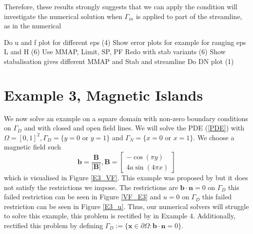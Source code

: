 \documentclass[12pt]{ociamthesis}
\begin{document}
Therefore, these results strongly suggests that we can apply the condition  will investigate the numerical solution when $\Gamma_{in}$ is applied to part of the streamline, as in the numerical

Do u and f plot for different eps (4)
Show error plots for example for ranging eps  L and H (6)
Use MMAP, Limit, SP, PF
Redo with stab variants (6)
Show stabalisation gives different MMAP and Stab and streamline
Do DN plot (1)

\section{Example 3, Magnetic Islands}
We now solve an example on a square domain with non-zero boundary conditions on $\Gamma_D$ and with closed and open field lines. We will solve the PDE (\ref{PDE}) with $\Omega = [0,1]^2, \Gamma_D = \{y=0 \text{ or } y=1\}$ and $\Gamma_N = \{x=0 \text{ or } x=1\}$. We choose a magnetic field such 
\begin{equation}
\mathbf{b} = \frac{\mathbf{B}}{|\mathbf{B}|}, 
\mathbf{B} = \left[ \begin{matrix}
-\cos(\pi y)\\
4a \sin(4 \pi x)
\end{matrix} \right]
\end{equation}
which is visualised in Figure \ref{E3_VF}. This example was proposed by \cite{DN} but it does not satisfy the restrictions we impose. The restrictions are $\mathbf{b} \cdot \mathbf{n} = 0$ on $\Gamma_D$ this failed restriction can be seen in Figure \ref{VF_E3} and $u = 0$ on $\Gamma_D$ this failed restriction can be seen in Figure \ref{E3_u}. Thus, our numerical solvers will struggle to solve this example, this problem is rectified by in Example $4$. Additionally, \cite{DN} rectified this problem by defining $\Gamma_D := \{\mathbf{x} \in \partial \Omega :  \mathbf{b} \cdot \mathbf{n} = 0\}$.
\end{document}

